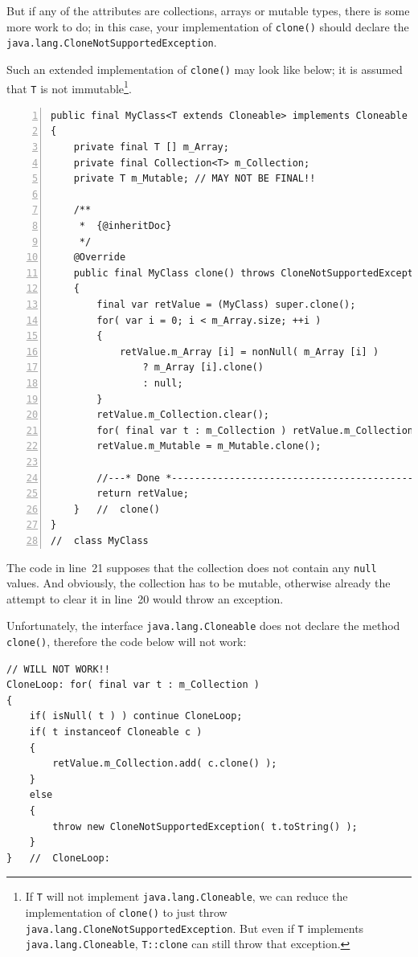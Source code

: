 \documentclass[11pt,a4paper, titlepage, parskip=half, headsepline, footsepline, cleardoublepage=current, headheight=1cm]{scrbook}
\begin{document}
But if any of the attributes are collections, arrays or mutable types, there is some
more work to do; in this case, your implementation of \lstinline|clone()| should declare the \lstinline|java.lang.CloneNotSupportedException|.

Such an extended implementation of \lstinline|clone()| may look like below; it is assumed that \lstinline|T| is not immutable\footnote{If \lstinline|T| will not implement  \lstinline|java.lang.Cloneable|, we can reduce the implementation of \lstinline|clone()| to just throw \lstinline|java.lang.CloneNotSupportedException|. But even if \lstinline|T| implements \lstinline|java.lang.Cloneable|, \lstinline|T::clone| can still throw that exception.}.
\begin{lstlisting}[numbers=left,caption={An extended clone() Method}]
public final MyClass<T extends Cloneable> implements Cloneable
{
    private final T [] m_Array;
    private final Collection<T> m_Collection;
    private T m_Mutable; // MAY NOT BE FINAL!!
    
    /**
     *  {@inheritDoc}
     */
    @Override
    public final MyClass clone() throws CloneNotSupportedException
    {
        final var retValue = (MyClass) super.clone();
        for( var i = 0; i < m_Array.size; ++i )
        {
            retValue.m_Array [i] = nonNull( m_Array [i] ) 
                ? m_Array [i].clone() 
                : null;
        }
        retValue.m_Collection.clear();
        for( final var t : m_Collection ) retValue.m_Collection.add( t.clone() );
        retValue.m_Mutable = m_Mutable.clone();
        
        //---* Done *------------------------------------------------
        return retValue;
    }   //  clone() 
}
//  class MyClass
\end{lstlisting}

The code in line~21 supposes that the collection does not contain any \lstinline|null| values. And obviously, the collection has to be mutable, otherwise already the attempt to clear it in line~20 would throw an exception.

Unfortunately, the interface \lstinline|java.lang.Cloneable| does not declare the method \lstinline|clone()|, therefore the code below will not work:
\begin{lstlisting}
// WILL NOT WORK!!
CloneLoop: for( final var t : m_Collection ) 
{
    if( isNull( t ) ) continue CloneLoop;
    if( t instanceof Cloneable c )
    {
        retValue.m_Collection.add( c.clone() );
    }
    else
    {
        throw new CloneNotSupportedException( t.toString() );
    }    
}   //  CloneLoop:
\end{lstlisting}
\end{document}
